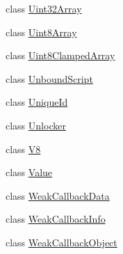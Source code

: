 \begin{DoxyCompactItemize}
\item 
class \hyperlink{classv8_1_1Uint32Array}{Uint32\+Array}
\item 
class \hyperlink{classv8_1_1Uint8Array}{Uint8\+Array}
\item 
class \hyperlink{classv8_1_1Uint8ClampedArray}{Uint8\+Clamped\+Array}
\item 
class \hyperlink{classv8_1_1UnboundScript}{Unbound\+Script}
\item 
class \hyperlink{classv8_1_1UniqueId}{Unique\+Id}
\item 
class \hyperlink{classv8_1_1Unlocker}{Unlocker}
\item 
class \hyperlink{classv8_1_1V8}{V8}
\item 
class \hyperlink{classv8_1_1Value}{Value}
\item 
class \hyperlink{classv8_1_1WeakCallbackData}{Weak\+Callback\+Data}
\item 
class \hyperlink{classv8_1_1WeakCallbackInfo}{Weak\+Callback\+Info}
\item 
class \hyperlink{classv8_1_1WeakCallbackObject}{Weak\+Callback\+Object}
\end{DoxyCompactItemize}

